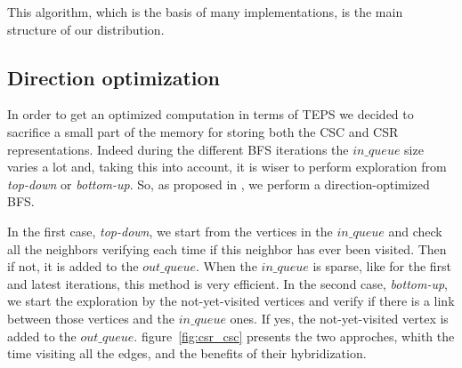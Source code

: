 This algorithm, which is the basis of many implementations, is the main structure of our distribution. 

\subsection{Direction optimization}

In order to get an optimized computation in terms of TEPS we decided to sacrifice a small part of the memory for storing both the CSC and CSR representations. 
Indeed during the different BFS iterations the $in\_queue$ size varies a lot and, taking this into account, it is wiser to perform exploration from \textit{top-down} or \textit{bottom-up}. 
So, as proposed in \cite{beamer2013direction}, we perform a direction-optimized BFS.

In the first case, \textit{top-down}, we start from the vertices in the $in\_queue$ and check all the neighbors verifying each time if this neighbor has ever been visited. 
Then if not, it is added to the $out\_queue$. 
When the $in\_queue$ is sparse, like for the first and latest iterations, this method is very efficient. 
In the second case, \textit{bottom-up}, we start the exploration by the not-yet-visited vertices and verify if there is a link between those vertices and the $in\_queue$ ones. 
If yes, the not-yet-visited vertex is added to the $out\_queue$. 
figure~\ref{fig:csr_csc} presents the two approches, whith the time visiting all the edges, and the benefits of their hybridization.


